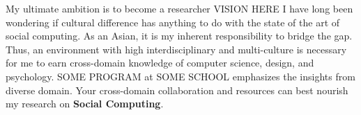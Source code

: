 %
\noindent
My ultimate ambition is to become a researcher VISION HERE
I have long been wondering if cultural difference has anything to do with the state of the art of social computing. 
As an Asian, it is my inherent responsibility to bridge the gap.
Thus, an environment with high interdisciplinary and multi-culture is necessary
for me to earn cross-domain knowledge of computer science, design, and psychology.
SOME PROGRAM at SOME SCHOOL emphasizes the insights from diverse domain. 
Your cross-domain collaboration and resources can best nourish my research on \textbf{Social Computing}.\\


